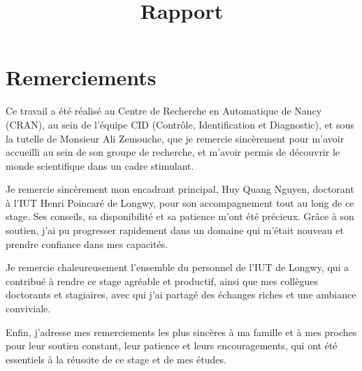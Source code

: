 \documentclass{name}
\title{Rapport} %
\begin{document}




        
\fairemarges %
\fairepagedegarde %
\tabledematieres %

\section*{Remerciements}

Ce travail a été réalisé au Centre de Recherche en Automatique de Nancy (CRAN), au sein de l’équipe CID (Contrôle, Identification et Diagnostic), et sous la tutelle de Monsieur Ali Zemouche, que je remercie sincèrement pour m’avoir accueilli au sein de son groupe de recherche, et m’avoir permis de découvrir le monde scientifique dans un cadre stimulant.

Je remercie sincèrement mon encadrant principal, Huy Quang Nguyen, doctorant à l’IUT Henri Poincaré de Longwy, pour son accompagnement tout au long de ce stage. Ses conseils, sa disponibilité et sa patience m’ont été précieux. Grâce à son soutien, j’ai pu progresser rapidement dans un domaine qui m’était nouveau et prendre confiance dans mes capacités.

Je remercie chaleureusement l’ensemble du personnel de l’IUT de Longwy, qui a contribué à rendre ce stage agréable et productif, ainsi que mes collègues doctorants et stagiaires, avec qui j’ai partagé des échanges riches et une ambiance conviviale.

Enfin, j’adresse mes remerciements les plus sincères à ma famille et à mes proches pour leur soutien constant, leur patience et leurs encouragements, qui ont été essentiels à la réussite de ce stage et de mes études.
\end{document}
